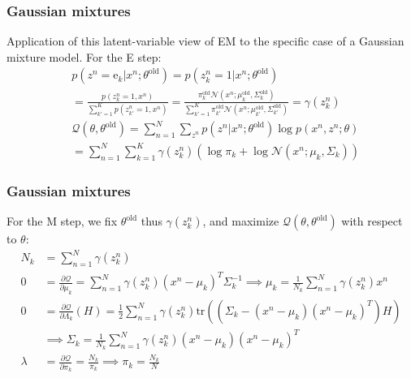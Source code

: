 \documentclass{beamer}
\begin{document}
\begin{frame}
    \frametitle{Gaussian mixtures}
    Application of this latent-variable view of EM to the specific case of a Gaussian mixture model. For the E step:
    \begin{align*}
        &p(z^{n}=\mathrm{e}_{k}|x^{n};\theta^{\textrm{old}})=p(z^{n}_{k}=1|x^{n};\theta^{\textrm{old}}) \\
        &=\frac{p(z^{n}_{k}=1,x^{n})}{\sum_{k'=1}^{K}p(z^{n}_{k'}=1,x^{n})}=\frac{\pi_{k}^{\textrm{old}}\mathcal{N}(x^{n};\mu_{k}^{\textrm{old}},\Sigma_{k}^{\textrm{old}})}{\sum_{k'=1}^{K}\pi_{k'}^{\textrm{old}}\mathcal{N}(x^{n};\mu_{k'}^{\textrm{old}},\Sigma_{k'}^{\textrm{old}})}=\gamma(z^{n}_{k}) \\
        &\mathcal{Q}(\theta,\theta^{\textrm{old}})=\sum_{n=1}^{N}\sum_{z^{n}}p(z^{n}|x^{n};\theta^{\textrm{old}})\log{}p(x^{n},z^{n};\theta) \\
        &=\sum_{n=1}^{N}\sum_{k=1}^{K}\gamma(z^{n}_{k})(\log\pi_{k}+\log\mathcal{N}(x^{n};\mu_{k},\Sigma_{k}))
    \end{align*}
\end{frame}

\begin{frame}
    \frametitle{Gaussian mixtures}
    For the M step, we fix $\theta^{\textrm{old}}$ thus $\gamma(z^{n}_{k})$, and maximize $\mathcal{Q}(\theta,\theta^{\textrm{old}})$ with respect to $\theta$:
    \begin{align*}
        N_{k}&=\sum_{n=1}^{N}\gamma(z^{n}_{k}) \\
        0&=\frac{\partial\mathcal{Q}}{\partial\mu_{k}}=\sum_{n=1}^{N}\gamma(z^{n}_{k})(x^{n}-\mu_{k})^{T}\Sigma_{k}^{-1}\implies\mu_{k}=\frac{1}{N_{k}}\sum_{n=1}^{N}\gamma(z^{n}_{k})x^{n} \\
        0&=\frac{\partial\mathcal{Q}}{\partial\Lambda_{k}}(H)=\frac{1}{2}\sum_{n=1}^{N}\gamma(z^{n}_{k})\mathrm{tr}((\Sigma_{k}-(x^{n}-\mu_{k})(x^{n}-\mu_{k})^{T})H) \\
        &\implies\Sigma_{k}=\frac{1}{N_{k}}\sum_{n=1}^{N}\gamma(z^{n}_{k})(x^{n}-\mu_{k})(x^{n}-\mu_{k})^{T} \\
        \lambda&=\frac{\partial\mathcal{Q}}{\partial\pi_{k}}=\frac{N_{k}}{\pi_{k}}\implies\pi_{k}=\frac{N_{k}}{N}
    \end{align*}
\end{frame}
\end{document}
